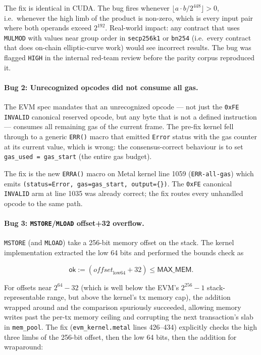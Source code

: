 The fix is identical in CUDA. The bug fires whenever
$\lfloor a \cdot b / 2^{448} \rfloor > 0$, i.e.\ whenever the high limb of
the product is non-zero, which is every input pair where both operands
exceed $2^{192}$. Real-world impact: any contract that uses
\texttt{MULMOD} with values near group order in
\texttt{secp256k1} or \texttt{bn254} (i.e.\ every contract that does
on-chain elliptic-curve work) would see incorrect results. The bug was
flagged \texttt{HIGH} in the internal red-team review before the parity
corpus reproduced it.

\paragraph{Bug 2: Unrecognized opcodes did not consume all gas.}

The EVM spec mandates that an unrecognized opcode --- not just the
\texttt{0xFE INVALID} canonical reserved opcode, but any byte that is
not a defined instruction --- consumes all remaining gas of the current
frame. The pre-fix kernel fell through to a generic \texttt{ERR()} macro
that emitted \texttt{Error} status with the gas counter at its current
value, which is wrong: the consensus-correct behaviour is to set
\texttt{gas\_used = gas\_start} (the entire gas budget).

The fix is the new \texttt{ERRA()} macro on Metal kernel line 1059
(\texttt{ERR-all-gas}) which emits \texttt{(status=Error, gas=gas\_start,
output=\{\})}. The \texttt{0xFE} canonical \texttt{INVALID} arm at line
1035 was already correct; the fix routes every unhandled opcode to the
same path.

\paragraph{Bug 3: \texttt{MSTORE}/\texttt{MLOAD} offset+32 overflow.}

\texttt{MSTORE} (and \texttt{MLOAD}) take a 256-bit memory offset on the
stack. The kernel implementation extracted the low 64 bits and
performed the bounds check as

\[
\mathsf{ok} := (\mathit{offset}_{\text{low64}} + 32) \le \mathsf{MAX\_MEM}.
\]

For offsets near $2^{64} - 32$ (which is well below the EVM's
$2^{256} - 1$ stack-representable range, but above the kernel's tx
memory cap), the addition wrapped around and the comparison spuriously
succeeded, allowing memory writes past the per-tx memory ceiling and
corrupting the next transaction's slab in
\texttt{mem\_pool}. The fix (\texttt{evm\_kernel.metal} lines 426--434)
explicitly checks the high three limbs of the 256-bit offset, then the
low 64 bits, then the addition for wraparound:


